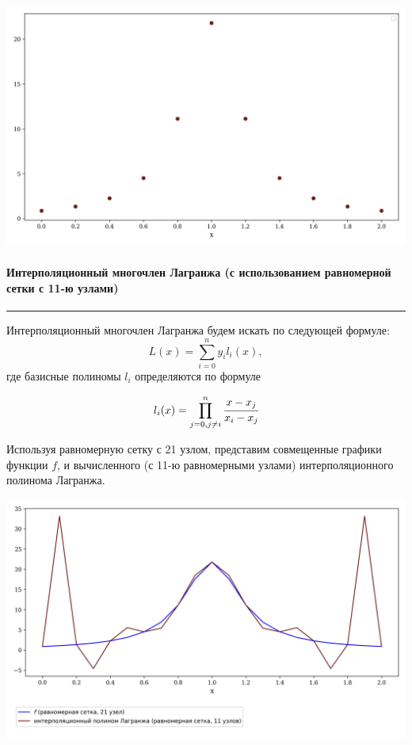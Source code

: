 \documentclass[a4paper, 14pt]{extarticle}
\begin{document}
\begin{center}
  \includegraphics[width=1\textwidth]{scatter1}
\end{center}

\vfill

\newpage

\paragraph*{Интерполяционный многочлен Лагранжа (с использованием равномерной сетки с 11-ю узлами)}\vspace{-20pt}\rule{\linewidth}{0.1mm}

Интерполяционный многочлен Лагранжа будем искать по следующей формуле:
\begin{equation*}
  L(x) = \sum_{i = 0}^{n} y_i l_i(x),
\end{equation*}
где базисные полиномы $l_i$ определяются по формуле 

\begin{equation*}
  l_i(x) = \prod_{j=0, j\neq i}^{n} \cfrac{x - x_j}{x_i - x_j}
\end{equation*}

Используя равномерную сетку с 21 узлом, представим совмещенные графики функции $f$, и 
вычисленного (с 11-ю равномерными узлами) интерполяционного полинома Лагранжа.

\begin{center}
  \includegraphics[width=1\textwidth]{uniformXref21}
\end{center}
\end{document}
